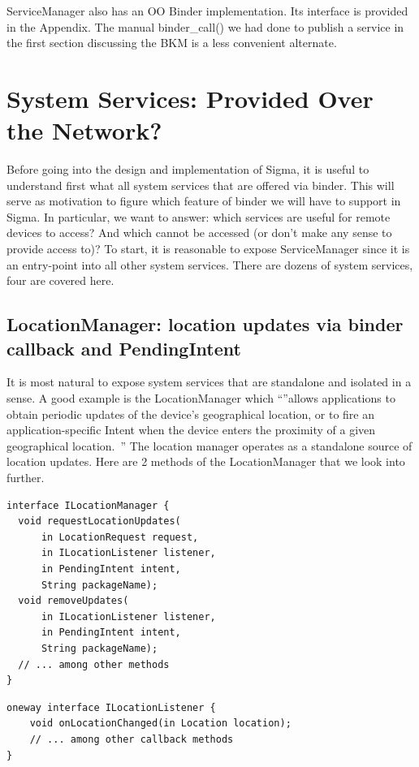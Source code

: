 \documentclass[prodmode]{acmlarge}
\begin{document}
ServiceManager also has an OO Binder implementation. Its interface is provided in the Appendix. The manual binder\_call() we had done to publish a service in the first section discussing the BKM is a less convenient alternate.

\section{System Services: Provided Over the Network?}
Before going into the design and implementation of Sigma, it is useful to understand first what all system services that are offered via binder. This will serve as motivation to figure which feature of binder we will have to support in Sigma. In particular, we want to answer: which services are useful for remote devices to access? And which cannot be accessed (or don't make any sense to provide access to)?  To start, it is reasonable to expose ServiceManager since it is an entry-point into all other system services. There are dozens of system services, four are covered here.

\subsection{LocationManager: location updates via binder callback and PendingIntent}
It is most natural to expose system services that are standalone and isolated in a sense. A good example is the LocationManager which ``''allows applications to obtain periodic updates of the device's geographical location, or to fire an application-specific Intent when the device enters the proximity of a given geographical location.~\cite{LocationManagerDocs}'' The location manager operates as a standalone source of location updates. Here are 2 methods of the LocationManager that we look into further.
\begin{Verbatim}[samepage=true]
interface ILocationManager {
  void requestLocationUpdates(
      in LocationRequest request,
      in ILocationListener listener,
      in PendingIntent intent,
      String packageName);
  void removeUpdates(
      in ILocationListener listener,
      in PendingIntent intent,
      String packageName);
  // ... among other methods
}
\end{Verbatim}

\begin{Verbatim}[samepage=true]
oneway interface ILocationListener {
    void onLocationChanged(in Location location);
    // ... among other callback methods
}
\end{Verbatim}
\end{document}
